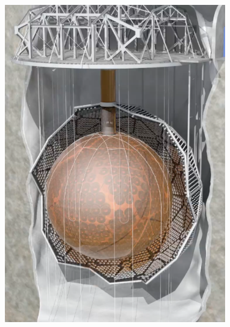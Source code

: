 \begin{figure}[htbp]
    \centering
    \begin{minipage}
        [htbp]{0.45\textwidth}
        \centering
        \includegraphics[width=0.85\textwidth]{figures/cavity.png}
    \end{minipage}
    \hfill %
    \begin{minipage}[htbp]{0.45\textwidth}
        \centering

\end{minipage}
\end{figure}
